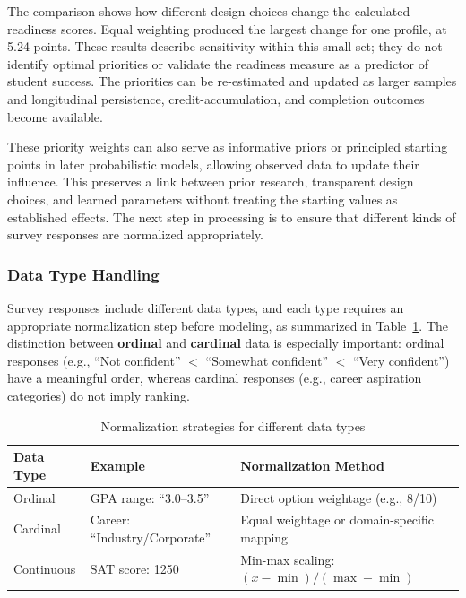 \documentclass[letterpaper,11pt]{article}
\begin{document}
The comparison shows how different design choices change the calculated readiness scores. Equal weighting produced the largest change for one profile, at 5.24 points. These results describe sensitivity within this small set; they do not identify optimal priorities or validate the readiness measure as a predictor of student success. The priorities can be re-estimated and updated as larger samples and longitudinal persistence, credit-accumulation, and completion outcomes become available.

These priority weights can also serve as informative priors or principled starting points in later probabilistic models, allowing observed data to update their influence. This preserves a link between prior research, transparent design choices, and learned parameters without treating the starting values as established effects. The next step in processing is to ensure that different kinds of survey responses are normalized appropriately.

\subsubsection{Data Type Handling}

Survey responses include different data types, and each type requires an appropriate normalization step before modeling, as summarized in Table~\ref{tab:normalization}. The distinction between \textbf{ordinal} and \textbf{cardinal} data is especially important: ordinal responses (e.g., ``Not confident'' $<$ ``Somewhat confident'' $<$ ``Very confident'') have a meaningful order, whereas cardinal responses (e.g., career aspiration categories) do not imply ranking.

\begin{table}[htbp]
\centering
\caption{Normalization strategies for different data types}
\label{tab:normalization}
\begin{tabular}{@{}lll@{}}
\toprule
\textbf{Data Type} & \textbf{Example} & \textbf{Normalization Method} \\
\midrule
Ordinal & GPA range: ``3.0--3.5'' & Direct option weightage (e.g., 8/10) \\
Cardinal & Career: ``Industry/Corporate'' & Equal weightage or domain-specific mapping \\
Continuous & SAT score: 1250 & Min-max scaling: $(x - \min)/(\max - \min)$ \\
\bottomrule
\end{tabular}
\end{table}
\end{document}
